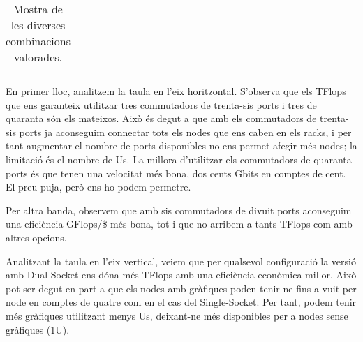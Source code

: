 \begin{table}[H]
\begin{adjustwidth}{-1.0in}{-1.0in}
\begin{center}
\begin{tabular}{ll|c|c|c|c}
\end{tabular}
\caption{Mostra de les diverses combinacions valorades.}
\end{center}
\end{adjustwidth}
\end{table}

En primer lloc, analitzem la taula en l'eix horitzontal. S'observa que els TFlops que ens garanteix utilitzar tres commutadors de trenta-sis ports i tres de quaranta són els mateixos. Això és degut a que amb els commutadors de trenta-sis ports ja aconseguim connectar tots els nodes que ens caben en els racks, i per tant augmentar el nombre de ports disponibles no ens permet afegir més nodes; la limitació és el nombre de Us. La millora d'utilitzar els commutadors de quaranta ports és que tenen una velocitat més bona, dos cents Gbits en comptes de cent. El preu puja, però ens ho podem permetre.

Per altra banda, observem que amb sis commutadors de divuit ports aconseguim una eficiència GFlops/\$ més bona, tot i que no arribem a tants TFlops com amb altres opcions.

Analitzant la taula en l'eix vertical, veiem que per qualsevol configuració la versió amb Dual-Socket ens dóna més TFlops amb una eficiència econòmica millor. Això pot ser degut en part a que els nodes amb gràfiques poden tenir-ne fins a vuit per node en comptes de quatre com en el cas del Single-Socket. Per tant, podem tenir més gràfiques utilitzant menys Us, deixant-ne més disponibles per a nodes sense gràfiques (1U).


